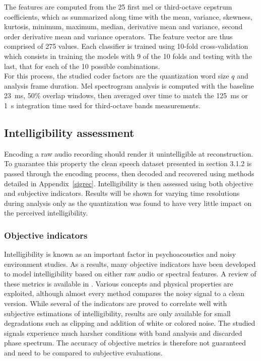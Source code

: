 \documentclass[12pt,times,onecolumn]{article}
\begin{document}
The features are computed from the 25 first mel or third-octave cepstrum coefficients, which as summarized along time with the mean, variance, skewness, kurtosis, minimum, maximum, median, derivative mean and variance, second order derivative mean and variance operators. The feature vector are thus comprised of 275 values. Each classifier is trained using 10-fold cross-validation which consists in training the models with 9 of the 10 folds and testing with the last, that for each of the 10 possible combinations.\\

For this process, the studied coder factors are the quantization word size $q$ and analysis frame duration. Mel spectrogram analysis is computed with the baseline 23~ms, 50\% overlap windows, then averaged over time to match the 125~ms or 1~s integration time used for third-octave bands measurements.

\subsection{Intelligibility assessment}

Encoding a raw audio recording should render it unintelligible at reconstruction. To guarantee this property the clean speech dataset presented in section 3.1.2 is passed through the encoding process, then decoded and recovered using methods detailed in Appendix~\ref{sigrec}. Intelligibility is then assessed using both objective and subjective indicators. Results will be shown for varying time resolutions during analysis only as the quantization was found to have very little impact on the perceived intelligibility.

\subsubsection{Objective indicators}

Intelligibility is known as an important factor in psychoacoustics and noisy environment studies. As a results, many objective indicators have been developed to model intelligibility based on either raw audio or spectral features. A review of these metrics is available in \cite{ma2009}. Various concepts and physical properties are exploited, although almost every method compares the noisy signal to a clean version. While several of the indicators are proved to correlate well with subjective estimations of intelligibility, results are only available for small degradations such as clipping and addition of white or colored noise. The studied signals experience much harsher conditions with band analysis and discarded phase spectrum. The accuracy of objective metrics is therefore not guaranteed and need to be compared to subjective evaluations.\\
\end{document}

